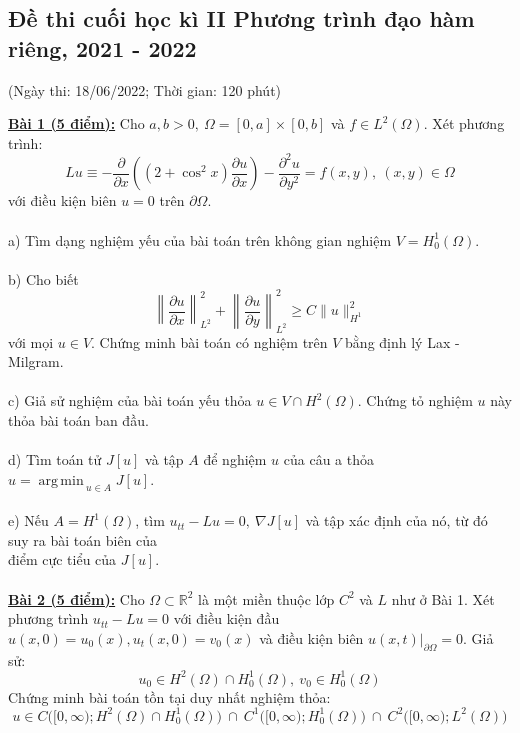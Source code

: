 \documentclass[10.5pt, a4paper]{article}
\DeclareMathOperator*{\argmin}{arg\,min\,}
\begin{document}
\subsection{Đề thi cuối học kì II Phương trình đạo hàm riêng, 2021 - 2022}
\begin{center}
	\color{blue}(Ngày thi: 18/06/2022; Thời gian: 120 phút)
\end{center}
\color{red}\underline{\textbf{Bài 1 (5 điểm):}} \color{black}Cho $a,b>0,~\Omega=[0,a]\times[0,b]$ và $f\in L^2(\Omega)$. Xét phương trình: $$Lu\equiv-\dfrac{\partial}{\partial x}\left((2+\cos^2x)\dfrac{\partial u}{\partial x}\right)-\dfrac{\partial^2u}{\partial y^2}=f(x,y),~(x,y)\in\Omega$$
với điều kiện biên $u=0$ trên $\partial\Omega$.\\\\
\color{red}a) \color{black}Tìm dạng nghiệm yếu của bài toán trên không gian nghiệm $V=H_0^1(\Omega)$.\\\\
\color{red}b) \color{black}Cho biết $$\left\lVert\dfrac{\partial u}{\partial x}\right\rVert_{L^2}^2+\left\lVert\dfrac{\partial u}{\partial y}\right\rVert_{L^2}^2\ge C\lVert u\rVert_{H^1}^2$$ với mọi $u\in V$. Chứng minh bài toán có nghiệm trên $V$ bằng định lý Lax - Milgram.\\\\
\color{red}c) \color{black}Giả sử nghiệm của bài toán yếu thỏa $u\in V\cap H^2(\Omega)$. Chứng tỏ nghiệm $u$ này thỏa bài toán ban đầu.\\\\
\color{red}d) \color{black}Tìm toán tử $J[u]$ và tập $A$ để nghiệm $u$ của câu a thỏa $u=\displaystyle\argmin_{u\in A}J[u]$.\\\\
\color{red}e) \color{black}Nếu $A=H^1(\Omega)$, tìm $u_{tt}-Lu=0,~\nabla J[u]$ và tập xác định của nó, từ đó suy ra bài toán biên của\\ điểm cực tiểu của $J[u]$.\\\\
\color{red}\underline{\textbf{Bài 2 (5 điểm):}} \color{black}Cho $\Omega\subset\mathbb R^2$ là một miền thuộc lớp $C^2$ và $L$ như ở Bài 1. Xét phương trình $u_{tt}-Lu=0$ với điều kiện đầu $u(x,0)=u_0(x),u_t(x,0)=v_0(x)$ và điều kiện biên $u(x,t)\big|_{\partial\Omega}=0$. Giả sử: $$u_0\in H^2(\Omega)\cap H_0^1(\Omega),~v_0\in H_0^1(\Omega)$$
Chứng minh bài toán tồn tại duy nhất nghiệm thỏa: $$u\in C\big([0,\infty); H^2(\Omega)\cap H_0^1(\Omega)\big)~\cap~C^1\big([0,\infty); H_0^1(\Omega)\big)~\cap~C^2\big([0,\infty); L^2(\Omega)\big)$$
\end{document}
